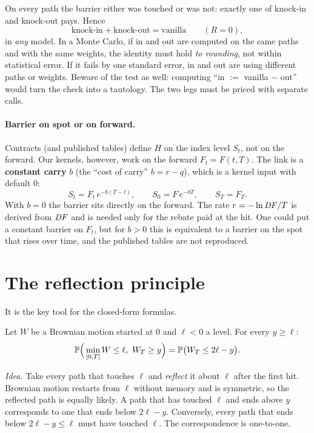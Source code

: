 \begin{idea}[title={Key idea: in + out = vanilla}]
On every path the barrier either was touched or was not: exactly one of knock-in and knock-out pays. Hence
\begin{equation}\label{eq:in-out}
\text{knock-in}+\text{knock-out}=\text{vanilla}\qquad(R=0),
\end{equation}
in \emph{any} model. In a Monte Carlo, if in and out are computed on the same paths and with the same weights, the
identity must hold \emph{to rounding}, not within statistical error. If it fails by one standard error, in and out are
using different paths or weights. Beware of the test as well: computing ``in $:=$ vanilla $-$ out'' would turn the
check into a tautology. The two legs must be priced with separate calls.
\end{idea}

\paragraph{Barrier on spot or on forward.} Contracts (and published tables) define $H$ on the index level $S_t$, not
on the forward. Our kernels, however, work on the forward $F_t=F(t,T)$. The link is a \textbf{constant carry} $b$
(the ``cost of carry'' $b=r-q$), which is a kernel input with default 0:
\begin{equation}\label{eq:spot-da-forward}
S_t=F_t\,e^{-b(T-t)},\qquad S_0=F\,e^{-bT},\qquad S_T=F_T .
\end{equation}
With $b=0$ the barrier sits directly on the forward. The rate $r=-\ln\mathit{DF}/T$ is derived from $\mathit{DF}$ and is needed only
for the rebate paid at the hit. One could put a constant barrier on $F_t$, but for $b>0$ this is equivalent to a
barrier on the spot that rises over time, and the published tables are not reproduced.

\section{The reflection principle}
It is the key tool for the closed-form formulas.
\begin{proposizione}
Let $W$ be a Brownian motion started at 0 and $\ell<0$ a level. For every $y\ge\ell$:
\begin{equation}
\mathbb{P}\Big(\min_{[0,T]}W\le\ell,\ W_T\ge y\Big)=\mathbb{P}\big(W_T\le2\ell-y\big).
\end{equation}
\end{proposizione}
\emph{Idea.} Take every path that touches $\ell$ and \emph{reflect} it about $\ell$ after the first hit. Brownian
motion restarts from $\ell$ without memory and is symmetric, so the reflected path is equally likely. A path that has
touched $\ell$ and ends above $y$ corresponds to one that ends below $2\ell-y$. Conversely, every path that ends below
$2\ell-y\le\ell$ must have touched $\ell$. The correspondence is one-to-one.

